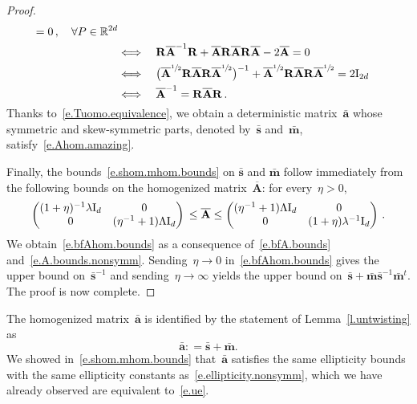 \documentclass[11pt]{article} %
\numberwithin{equation}{section}
\theoremstyle{definition}
\newcommand*{\Id}{\ensuremath{\mathrm{I}_d}}
\newcommand*{\R}{\ensuremath{\mathbb{R}}}
\renewcommand{\a}{\mathbf{a}}
\newcommand{\ahom}{\bar{\a}}
\newcommand{\shom}{\bar{\mathbf{s}}}
\newcommand{\mhom}{\bar{\mathbf{m}}}
\newcommand{\bfA}{\mathbf{A}}
\newcommand{\bfAhom}{\overline{\mathbf{A}}}
\newcommand{\rota}{\mathbf{R}}
\begin{document}
\begin{proof}
\begin{align}
= 0
\,, \quad \forall P \in \R^{2d} 
\notag \\ & 
\Longleftrightarrow \quad
\rota \overline{\bfA}^{-1} \rota + \overline{\bfA} \rota \overline{\bfA} \rota \overline{\bfA} - 2 \overline{\bfA}     = 0 
\notag \\ & 
\Longleftrightarrow \quad
\bigl(\overline{\bfA}^{\sfrac12} \rota \overline{\bfA} \rota \overline{\bfA}^{\sfrac12}\bigr)^{-1} + \overline{\bfA}^{\sfrac12} \rota \overline{\bfA} \rota \overline{\bfA}^{\sfrac12}  =  2  \mathrm{I}_{2d} 
\notag \\ & 
\Longleftrightarrow \quad
\overline{\bfA}^{-1}
= 
\rota \overline{\bfA} \rota
\,.
\end{align}
Thanks to~\eqref{e.Tuomo.equivalence}, we obtain a deterministic matrix~$\ahom$ whose symmetric and skew-symmetric parts, denoted by~$\shom$ and~$\mhom$, satisfy~\eqref{e.Ahom.amazing}.

\smallskip

Finally, the bounds~\eqref{e.shom.mhom.bounds} on $\shom$ and $\mhom$ follow immediately from the following bounds on the homogenized matrix~$\bfAhom$: for every~$\eta>0$,
\begin{equation}
\label{e.bfAhom.bounds}
\begin{pmatrix} (1+\eta)^{-1} \lambda  \Id  & 0 \\ 0 & ( \eta^{-1}+1)\Lambda  \Id \end{pmatrix}
\\
\leq \bfAhom \leq 
\begin{pmatrix}  (\eta^{-1} +1) \Lambda  \Id & 0 \\ 0 & (1+\eta) \lambda^{-1}  \Id \end{pmatrix}
\,.
\end{equation}
We obtain~\eqref{e.bfAhom.bounds} as a consequence of~\eqref{e.bfA.bounds} and~\eqref{e.A.bounds.nonsymm}. 
Sending~$\eta \to 0$ in~\eqref{e.bfAhom.bounds} gives the upper bound on~$\shom^{-1}$ and sending~$\eta \to\infty$ yields the upper bound on~$\shom + \mhom\shom^{-1}\mhom^t$. 
The proof is now complete.
\end{proof}


The homogenized matrix~$\ahom$ is identified by the statement of Lemma~\ref{l.untwisting} as
\begin{equation}
\label{e.ahom.def.nonsymm}
\ahom : = \shom + \mhom. 
\end{equation}
We showed in~\eqref{e.shom.mhom.bounds} that~$\ahom$ satisfies the same ellipticity bounds with the same ellipticity constants as~\eqref{e.ellipticity.nonsymm}, which we have already observed are equivalent to~\eqref{e.ue}. 
\end{document}
